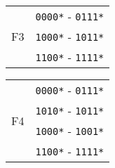 \begin{enumerate}
\begin{qsolve}
\begin{latin}
			
			
			\begin{center}
				\begin{tabular}{|c|c|}
					\hline
					\multirow{3}{*}{F3} & \texttt{0000*} - \texttt{0111*} \\ \cline{2-2}
					& \texttt{1000*} - \texttt{1011*} \\ \cline{2-2}
					& \texttt{1100*} - \texttt{1111*} \\ \hline
				\end{tabular}
			\end{center}
			
			
			
			\begin{center}
				\begin{tabular}{|c|c|}
					\hline
					\multirow{4}{*}{F4} & \texttt{0000*} - \texttt{0111*} \\ \cline{2-2}
					& \texttt{1010*} - \texttt{1011*} \\ \cline{2-2}
					& \texttt{1000*} - \texttt{1001*} \\ \cline{2-2}
					& \texttt{1100*} - \texttt{1111*} \\ \hline
				\end{tabular}
			\end{center}
		\end{latin}
		
	\end{qsolve}
\end{enumerate}
\newpage


